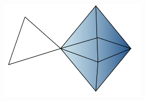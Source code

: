 \documentclass[landscape,a0paper,blockverticalspace = 5mm]{tikzposter}
\begin{document}
\begin{columns}
{{\begin{center}
\begin{minipage}{0.16\linewidth}
\begin{center}
          \end{center}
      \end{minipage}
   \begin{minipage}{0.1\linewidth}
      \begin{center}


         \end{center}
      \end{minipage} \hspace{0cm}
	\begin{minipage}{0.16\linewidth}
	\begin{center}
          \includegraphics[height=5cm]{figures/high-order.png}


          \end{center}
      \end{minipage}
    \end{center}



}}
\end{columns}
\end{document}
